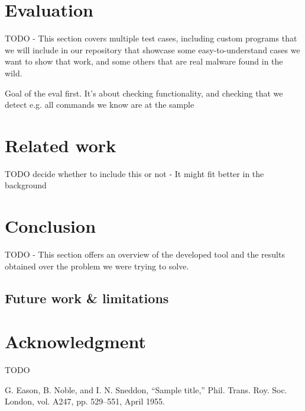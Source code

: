 \documentclass[conference]{IEEEtran}
\begin{document}

\section{Evaluation}
TODO - This section covers multiple test cases, including custom programs that we will include in our repository that showcase
some easy-to-understand cases we want to show that work, and some others that are real malware found in the wild.

Goal of the eval first. It's about checking functionality, and checking that we detect e.g. all commands we know are at the sample

\section{Related work}
TODO decide whether to include this or not - It might fit better in the background

\section{Conclusion}
TODO - This section offers an overview of the developed tool and the results obtained over the problem we were trying to solve.

\subsection{Future work \& limitations}

\section*{Acknowledgment}
TODO

\begin{thebibliography}{00}
 G. Eason, B. Noble, and I. N. Sneddon, ``Sample title,'' Phil. Trans. Roy. Soc. London, vol. A247, pp. 529--551, April 1955.
\end{thebibliography}
\vspace{12pt}
\end{document}
